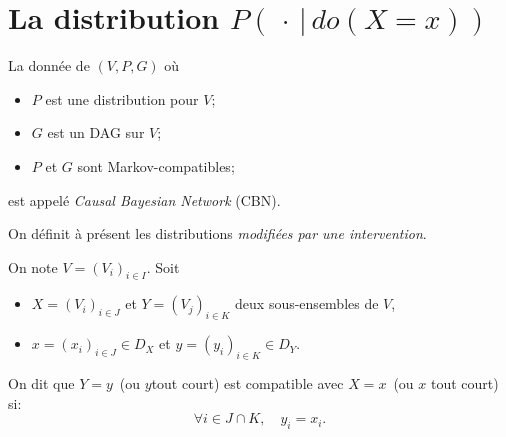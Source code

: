 \section{La distribution $P(\,\cdot\,|\,do(X=x))$}
\label{sec:la-distribution-p}

\begin{definition}
La donnée de $(V,P,G)$ où
\begin{itemize}
\item $P$ est une distribution pour $V$;
\item $G$ est un DAG sur $V$;
\item $P$ et $G$ sont Markov-compatibles;
\end{itemize}
est appelé \emph{Causal Bayesian Network} (CBN).
\end{definition}


On définit à présent les distributions \emph{modifiées par une intervention}.

\begin{definition}
On note $V=(V_i)_{i\in I}$. Soit 
\begin{itemize}
\item $X=(V_i)_{i\in J}$ et $Y=(V_j)_{i\in K}$ deux sous-ensembles de $V$,
\item $x=(x_i)_{i\in J}\in D_{X}$ et  $y=(y_i)_{i\in K}\in D_Y$.
\end{itemize}
On dit que \og$Y=y$\fg\ (ou \og$y$\fg tout court) est compatible avec \og$X=x$\fg\ (ou $x$ tout court) si:
\[ \forall i\in J\cap K,\quad y_i=x_i. \]
\end{definition}

